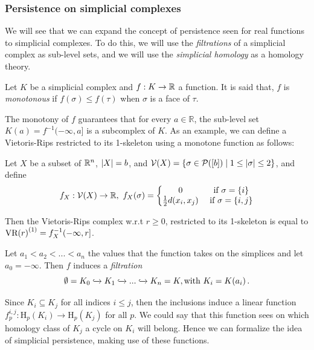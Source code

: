 \documentclass[../main.tex]{subfiles}
\begin{document}
\subsubsection*{Persistence on simplicial complexes}
We will see that we can expand the concept of persistence seen for real functions to simplicial complexes. To do this, we will use the \emph{filtrations} of a simplicial complex as sub-level sets, and we will use the \emph{simplicial homology} as a homology theory.

\begin{definition}
Let $K$ be a simplicial complex and $f: K \to \mathbb{R}$ a function. It is said that, $f$ is \emph{monotonous} if $f(\sigma) \leq f(\tau) $ when $\sigma$ is a face of $\tau$.
\end{definition}
\begin{sloppypar}
The monotony of $f$ guarantees that for every $a \in \mathbb {R}$, the sub-level set ${K(a) = f^{-1} (-\infty, a]} $ is a subcomplex of $K$. As an example, we can define a Vietoris-Rips restricted to its 1-skeleton using a monotone function as follows:
\end{sloppypar}

\begin{proposition}
Let $X$ be a subset of $\mathbb{R}^n$, $\left\lvert X \right\rvert=b$, and ${\mathcal{V}(X) = \{\sigma \in \mathcal{P}([b]) \mid 1 \leq \left\lvert \sigma \right\rvert \leq 2\}}$, and define
\[
f_X: \mathcal{V}(X) \to \mathbb{R},\ f_X(\sigma) = \left\{\begin{matrix}
0 &  \text{ if } \sigma=\{i\}\\
\frac{1}{2}d(x_i, x_j) & \text{ if } \sigma=\{i,j\}\\
\end{matrix}\right. 
\]

Then the Vietoris-Rips complex w.r.t $r\geq 0 $, restricted to its 1-skeleton is equal to ${\text{\rm VR}(r)}^{(1)}=f_X^{-1}(-\infty, r]$.
\end{proposition}


\begin{definition}
Let $a_1 <a_2 <... <a_n$ the values that the function takes on the simplices and let $ a_0 = -\infty$. Then $f$ induces a \emph{filtration}
\[
\emptyset = K_0 \xhookrightarrow{} K_1 \xhookrightarrow{} ... \xhookrightarrow{} K_n = K, \text{with } K_i = K (a_i) \,.
\]
\end{definition}
 
Since $K_i \subseteq K_j$ for all indices $i \leq j$, then the inclusions induce a linear function $f^{i,j}_p: \text{H}_p(K_i) \to \text{H}_p(K_j)$ for all $p$. We could say that this function sees on which homology class of $K_j$ a cycle on $K_i$ will belong. Hence we can formalize the idea of simplicial persistence, making use of these functions.
\end{document}
